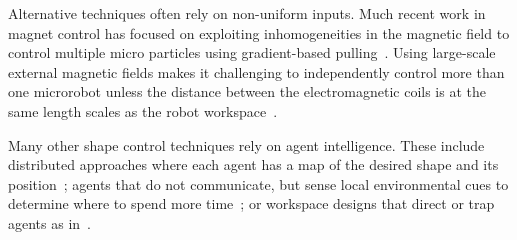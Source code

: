 Alternative techniques often rely on non-uniform inputs.
 Much recent work in magnet control has focused on exploiting inhomogeneities in the magnetic field to control multiple micro particles using gradient-based pulling~\cite{Salmanipour2018EightDOF,Denasi2018independent}.  
Using large-scale external magnetic fields makes it challenging to independently control more than one microrobot unless the distance between the electromagnetic coils is at the same length scales as the robot workspace~\cite{diller2016six}.
 
 Many other shape control techniques rely on agent intelligence.
 These include distributed approaches where each agent has a map of the desired shape and its position~\cite{bandyopadhyay2017probabilistic,rubenstein2014programmable}; %
  agents that do not communicate, but sense local environmental cues to determine where to spend more time~\cite{li2017decentralized};
 or workspace designs that direct or trap agents as in~\cite{fine2013eliciting}.


